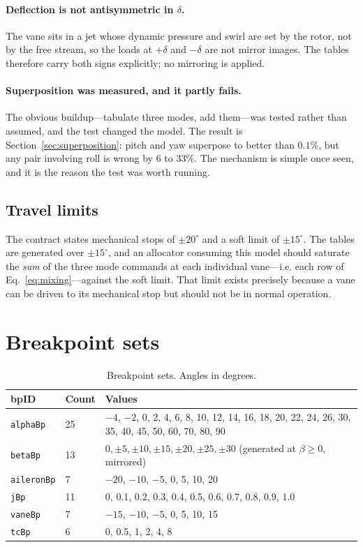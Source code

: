 \documentclass[11pt,a4paper]{article}
\newcommand{\varid}[1]{\texttt{\small #1}}
\newcommand{\dg}{^\circ}
\begin{document}
\paragraph{Deflection is not antisymmetric in $\delta$.} The vane sits in
a jet whose dynamic pressure and swirl are set by the rotor, not by the
free stream, so the loads at $+\delta$ and $-\delta$ are not mirror
images. The tables therefore carry both signs explicitly; no mirroring is
applied.

\paragraph{Superposition was measured, and it partly fails.} The obvious
buildup---tabulate three modes, add them---was tested rather than
assumed, and the test changed the model. The result is
Section~\ref{sec:superposition}: pitch and yaw superpose to better than
$0.1\%$, but any pair involving roll is wrong by $6$ to $33\%$. The
mechanism is simple once seen, and it is the reason the test was worth
running.

\subsection{Travel limits}

The contract states mechanical stops of $\pm 20\dg$ and a soft limit of
$\pm 15\dg$. The tables are generated over $\pm 15\dg$, and an allocator
consuming this model should saturate the \emph{sum} of the three mode
commands at each individual vane---i.e. each row of
Eq.~\eqref{eq:mixing}---against the soft limit. That limit exists
precisely because a vane can be driven to its mechanical stop but should
not be in normal operation.

\section{Breakpoint sets}

\begin{table}[htbp]
\centering
\caption{Breakpoint sets. Angles in degrees.}
\label{tab:breakpoints}
\begin{tabular}{@{}llp{78mm}@{}}
\toprule
\textbf{bpID} & \textbf{Count} & \textbf{Values} \\
\midrule
\varid{alphaBp} & 25 & $-4$, $-2$, 0, 2, 4, 6, 8, 10, 12, 14, 16, 18, 20,
22, 24, 26, 30, 35, 40, 45, 50, 60, 70, 80, 90 \\
\varid{betaBp} & 13 & $0, \pm5, \pm10, \pm15, \pm20, \pm25, \pm30$
(generated at $\beta \geq 0$, mirrored) \\
\varid{aileronBp} & 7 & $-20$, $-10$, $-5$, 0, 5, 10, 20 \\
\varid{jBp} & 11 & 0, 0.1, 0.2, 0.3, 0.4, 0.5, 0.6, 0.7, 0.8, 0.9, 1.0 \\
\varid{vaneBp} & 7 & $-15$, $-10$, $-5$, 0, 5, 10, 15 \\
\varid{tcBp} & 6 & 0, 0.5, 1, 2, 4, 8 \\
\bottomrule
\end{tabular}
\end{table}
\end{document}
